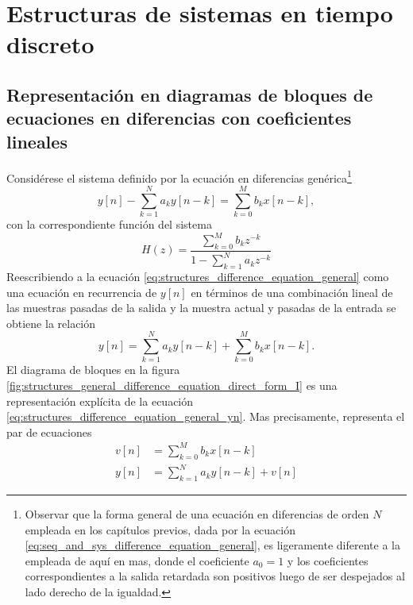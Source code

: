 \documentclass[a4paper]{report}
\begin{document}
\chapter{Estructuras de sistemas en tiempo discreto}\label{ch:structures}

\section{Representación en diagramas de bloques de ecuaciones en diferencias con coeficientes lineales}\label{sec:structures_block_diagram_representation}

Considérese el sistema definido por la ecuación en diferencias genérica\footnote{Observar que la forma general de una ecuación en diferencias de orden \(N\) empleada en los capítulos previos, dada por la ecuación \ref{eq:seq_and_sys_difference_equation_general}, es ligeramente diferente a la empleada de aquí en mas, donde el coeficiente \(a_0=1\) y los coeficientes correspondientes a la salida retardada son positivos luego de ser despejados al lado derecho de la igualdad.}
\begin{equation}\label{eq:structures_difference_equation_general}
 y[n]-\sum_{k=1}^N a_k y[n-k]=\sum_{k=0}^M b_k x[n-k],
\end{equation}
con la correspondiente función del sistema
\begin{equation}\label{eq:structures_difference_equation_general_system_function}
 H(z)=\dfrac{\displaystyle\sum_{k=0}^M b_kz^{-k}}{\displaystyle 1-\sum_{k=1}^N a_kz^{-k}} 
\end{equation}
Reescribiendo a la ecuación \ref{eq:structures_difference_equation_general} como una ecuación en recurrencia de \(y[n]\) en términos de  una combinación lineal de las muestras pasadas de la salida y la muestra actual y pasadas de la entrada se obtiene la relación
\begin{equation}\label{eq:structures_difference_equation_general_yn}
 y[n]=\sum_{k=1}^N a_k y[n-k]+\sum_{k=0}^M b_k x[n-k].
\end{equation}
El diagrama de bloques en la figura \ref{fig:structures_general_difference_equation_direct_form_I} es una representación explícita de la ecuación \ref{eq:structures_difference_equation_general_yn}. Mas precisamente, representa el par de ecuaciones 
\begin{align*}
 v[n]&=\sum_{k=0}^M b_k x[n-k]\\
 y[n]&=\sum_{k=1}^N a_k y[n-k]+v[n]
\end{align*}
\end{document}
